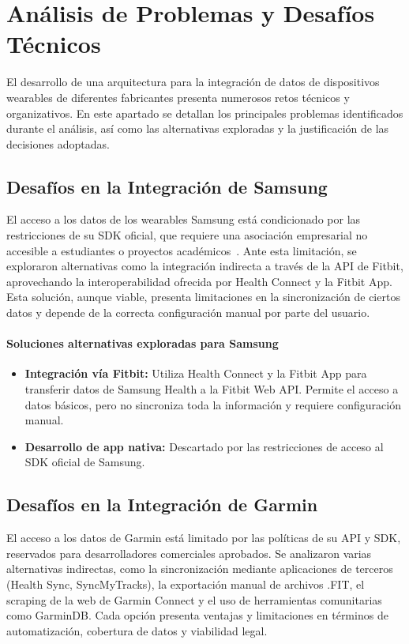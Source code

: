 \section{Análisis de Problemas y Desafíos Técnicos}

El desarrollo de una arquitectura para la integración de datos de dispositivos wearables de diferentes fabricantes presenta numerosos retos técnicos y organizativos. En este apartado se detallan los principales problemas identificados durante el análisis, así como las alternativas exploradas y la justificación de las decisiones adoptadas.

\subsection{Desafíos en la Integración de Samsung}
El acceso a los datos de los wearables Samsung está condicionado por las restricciones de su SDK oficial, que requiere una asociación empresarial no accesible a estudiantes o proyectos académicos~\cite{PartnershipRequest}. Ante esta limitación, se exploraron alternativas como la integración indirecta a través de la API de Fitbit, aprovechando la interoperabilidad ofrecida por Health Connect y la Fitbit App. Esta solución, aunque viable, presenta limitaciones en la sincronización de ciertos datos y depende de la correcta configuración manual por parte del usuario.

\paragraph{Soluciones alternativas exploradas para Samsung}
\begin{itemize}
    \item \textbf{Integración vía Fitbit:} Utiliza Health Connect y la Fitbit App para transferir datos de Samsung Health a la Fitbit Web API. Permite el acceso a datos básicos, pero no sincroniza toda la información y requiere configuración manual.
    \item \textbf{Desarrollo de app nativa:} Descartado por las restricciones de acceso al SDK oficial de Samsung.
\end{itemize}

\subsection{Desafíos en la Integración de Garmin}
El acceso a los datos de Garmin está limitado por las políticas de su API y SDK, reservados para desarrolladores comerciales aprobados. Se analizaron varias alternativas indirectas, como la sincronización mediante aplicaciones de terceros (Health Sync, SyncMyTracks), la exportación manual de archivos .FIT, el scraping de la web de Garmin Connect y el uso de herramientas comunitarias como GarminDB. Cada opción presenta ventajas y limitaciones en términos de automatización, cobertura de datos y viabilidad legal.

